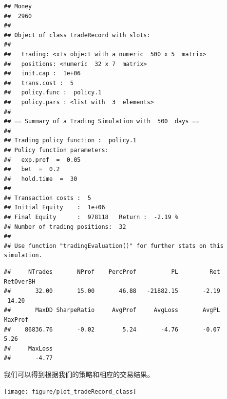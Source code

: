 \documentclass{article}\usepackage[]{graphicx}\usepackage[]{color}
\makeatletter
\newenvironment{kframe}{%
 \def\at@end@of@kframe{}%
 \ifinner\ifhmode%
  \def\at@end@of@kframe{\end{minipage}}%
  \begin{minipage}{\columnwidth}%
 \fi\fi%
 \def\FrameCommand##1{\hskip\@totalleftmargin \hskip-\fboxsep
 \colorbox{shadecolor}{##1}\hskip-\fboxsep
     \hskip-\linewidth \hskip-\@totalleftmargin \hskip\columnwidth}%
 \MakeFramed {\advance\hsize-\width
   \@totalleftmargin\z@ \linewidth\hsize
   \@setminipage}}%
 {\par\unskip\endMakeFramed%
 \at@end@of@kframe}
\newenvironment{knitrout}{}{} %
\makeatother
\begin{document}
\begin{CJK*}{UTF8}{gkai}
\begin{knitrout}
\color{fgcolor}\begin{kframe}
\begin{verbatim}
## Money 
##  2960
## 
## Object of class tradeRecord with slots:
## 
## 	 trading: <xts object with a numeric  500 x 5  matrix>
## 	 positions: <numeric  32 x 7  matrix>
## 	 init.cap :  1e+06 
## 	 trans.cost :  5 
## 	 policy.func :  policy.1 
## 	 policy.pars : <list with  3  elements>
## 
## == Summary of a Trading Simulation with  500  days ==
## 
## Trading policy function :  policy.1 
## Policy function parameters:
## 	 exp.prof  =  0.05 
## 	 bet  =  0.2 
## 	 hold.time  =  30 
## 
## Transaction costs :  5 
## Initial Equity    :  1e+06 
## Final Equity      :  978118   Return :  -2.19 %
## Number of trading positions:  32 
## 
## Use function "tradingEvaluation()" for further stats on this simulation.
\end{verbatim}
\end{kframe}
\end{knitrout}

\begin{knitrout}
\color{fgcolor}\begin{kframe}
\begin{verbatim}
##     NTrades       NProf    PercProf          PL         Ret   RetOverBH 
##       32.00       15.00       46.88   -21882.15       -2.19      -14.20 
##       MaxDD SharpeRatio     AvgProf     AvgLoss       AvgPL     MaxProf 
##    86836.76       -0.02        5.24       -4.76       -0.07        5.26 
##     MaxLoss 
##       -4.77
\end{verbatim}
\end{kframe}
\end{knitrout}

我们可以得到根据我们的策略和相应的交易结果。
\begin{knitrout}
\color{fgcolor}

{\centering \texttt{[image: figure/plot\_tradeRecord\_class]} 

}



\end{knitrout}
\end{CJK*}
\end{document}
